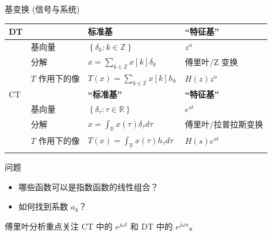 \documentclass[
  ignorenonframetext,
]{beamer}
\newcounter{none} %
\providecommand{\tightlist}{%
  \setlength{\itemsep}{0pt}\setlength{\parskip}{0pt}}
\begin{document}
\begin{frame}{基变换 (信号与系统)}
{\def\LTcaptype{none} %
\begin{longtable}[]{@{}
  >{\raggedright\arraybackslash}p{}
  >{\raggedright\arraybackslash}p{}
  >{\raggedright\arraybackslash}p{}
  >{\raggedright\arraybackslash}p{}@{}}
\toprule\noalign{}
\begin{minipage}[b]{\linewidth}\raggedright
DT
\end{minipage} & \begin{minipage}[b]{\linewidth}\raggedright
\end{minipage} & \begin{minipage}[b]{\linewidth}\raggedright
标准基
\end{minipage} & \begin{minipage}[b]{\linewidth}\raggedright
``特征基''
\end{minipage} \\
\midrule\noalign{}
\endhead
& 基向量 & \(\left\{\delta_{k}: k \in \mathbb{Z}\right\}\) & \(z^n\) \\
& 分解 & \(x=\sum_{k \in \mathbb{Z}} x[k] \delta_{k}\) & 傅里叶/Z
变换 \\
& \(T\) 作用下的像 & \(T(x)=\sum_{k \in \mathbb{Z}} x[k] h_{k}\) &
\(H(z) z^n\) \\
CT & & \textbf{``标准基''} & \textbf{``特征基''} \\
& 基向量 & \(\left\{\delta_{\tau}: \tau \in \mathbb{R}\right\}\) &
\(e^{st}\) \\
& 分解 & \(x=\int_{\mathbb{R}} x(\tau) \delta_{\tau} d \tau\) &
傅里叶/拉普拉斯变换 \\
& \(T\) 作用下的像 & \(T(x)=\int_{\mathbb{R}} x(\tau) h_{\tau} d \tau\)
& \(H(s) e^{st}\) \\
\bottomrule\noalign{}
\end{longtable}
}
\end{frame}

\begin{frame}{问题}
\protect{}\label{ux95eeux9898}
\begin{itemize}
\tightlist
\item
  哪些函数可以是指数函数的线性组合？
\item
  如何找到系数 \(a_{k}\)？
\end{itemize}

傅里叶分析重点关注 CT 中的 \(e^{j \omega t}\) 和 DT 中的
\(e^{j \omega n}\)。
\end{frame}
\end{document}
